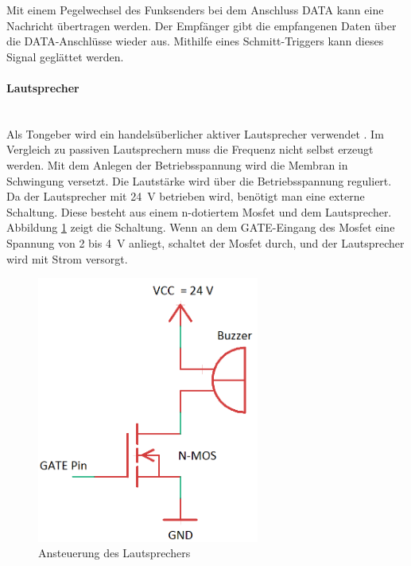 Mit einem Pegelwechsel des Funksenders bei dem Anschluss \si{DATA} kann eine Nachricht übertragen werden. Der Empfänger gibt die empfangenen Daten über die \si{DATA}-Anschlüsse wieder aus. Mithilfe eines Schmitt-Triggers kann dieses Signal geglättet werden.

\paragraph{Lautsprecher}\mbox{}\\
Als Tongeber wird ein handelsüberlicher aktiver Lautsprecher verwendet \cite{src_LAUTSPRECHER}. Im Vergleich zu passiven Lautsprechern muss die Frequenz nicht selbst erzeugt werden. Mit dem Anlegen der Betriebsspannung wird die Membran in Schwingung versetzt. Die Lautstärke wird über die Betriebsspannung reguliert. Da der Lautsprecher mit \SI{24}{\volt} betrieben wird, benötigt man eine externe Schaltung. Diese besteht aus einem n-dotiertem Mosfet und dem Lautsprecher. Abbildung \ref{img:schaltung} zeigt die Schaltung. Wenn an dem \si{GATE}-Eingang des Mosfet eine Spannung von \si{2} bis \SI{4}{\volt} anliegt, schaltet der Mosfet durch, und der Lautsprecher wird mit Strom versorgt.

\begin{figure}[H]
        \centering
		\hspace*{-1.5cm}
        \includegraphics[width=0.65\textwidth]{images/schaltung.png}
        \caption{Ansteuerung des Lautsprechers}
        \label{img:schaltung}
\end{figure}


